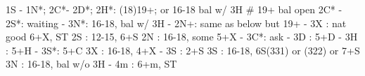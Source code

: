 1S - 1N*; 2C*- 2D*; 
2H*: (18)19+; or 16-18 bal w/ 3H  # 19+ bal open 2C*
   - 2S*: waiting
        - 3N*: 16-18, bal w/ 3H
        - 2N+: same as below but 19+
   - 3X : nat good 6+X, ST
2S : 12-15, 6+S
2N : 16-18, some 5+X
   - 3C*: ask
        - 3D : 5+D
        - 3H : 5+H
        - 3S*: 5+C
3X : 16-18, 4+X
   - 3S : 2+S
3S : 16-18, 6S(331) or (322) or 7+S
3N : 16-18, bal w/o 3H
   - 4m : 6+m, ST